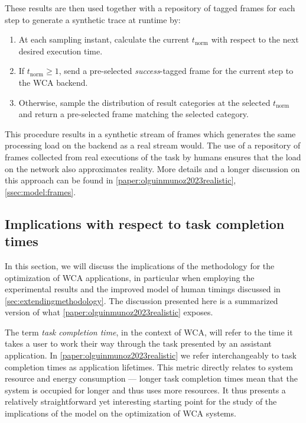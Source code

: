 These results are then used together with a repository of tagged frames for each step to generate a synthetic trace at runtime by:
\begin{enumerate}
    \item At each sampling instant, calculate the current \ensuremath{t_\text{norm}} with respect to the next desired execution time.
    \item If \ensuremath{t_\text{norm} \geq 1}, send a pre-selected \emph{success}-tagged frame for the current step to the \gls{WCA} backend.
    \item Otherwise, sample the distribution of result categories at the selected \ensuremath{t_\text{norm}} and return a pre-selected frame matching the selected category.
\end{enumerate}

This procedure results in a synthetic stream of frames which generates the same processing load on the backend as a real stream would.
The use of a repository of frames collected from real executions of the task by humans ensures that the load on the network also approximates reality.
More details and a longer discussion on this approach can be found in \cref{paper:olguinmunoz2023realistic}, \cref{ssec:model:frames}.

\subsection{Implications with respect to task completion times}


In this section, we will discuss the implications of the methodology for the optimization of \gls{WCA} applications, in particular when employing the experimental results and the improved model of human timings discussed in \cref{sec:extendingmethodology}.
The discussion presented here is a summarized version of what \cref{paper:olguinmunoz2023realistic} exposes.

The term \emph{task completion time}, in the context of \gls{WCA}, will refer to the time it takes a user to work their way through the task presented by an assistant application.
In \cref{paper:olguinmunoz2023realistic} we refer interchangeably to task completion times as application lifetimes.
This metric directly relates to system resource and energy consumption --- longer task completion times mean that the system is occupied for longer and thus uses more resources.
It thus presents a relatively straightforward yet interesting starting point for the study of the implications of the model on the optimization of \gls{WCA} systems.

